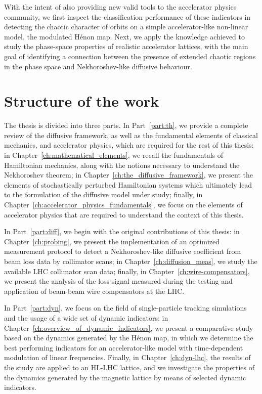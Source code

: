 With the intent of also providing new valid tools to the accelerator physics community, we first inspect the classification performance of these indicators in detecting the chaotic character of orbits on a simple accelerator-like non-linear model, the modulated Hénon map. Next, we apply the knowledge achieved to study the phase-space properties of realistic accelerator lattices, with the main goal of identifying a connection between the presence of extended chaotic regions in the phase space and Nekhoroshev-like diffusive behaviour.

\section*{Structure of the work}

The thesis is divided into three parts. In Part~\ref{part:th}, we provide a complete review of the diffusive framework, as well as the fundamental elements of classical mechanics, and accelerator physics, which are required for the rest of this thesis: in Chapter~\ref{ch:mathematical_elements}, we recall the fundamentals of Hamiltonian mechanics, along with the notions necessary to understand the Nekhoroshev theorem; in Chapter~\ref{ch:the_diffusive_framework}, we present the elements of stochastically perturbed Hamiltonian systems which ultimately lead to the formulation of the diffusive model under study; finally, in Chapter~\ref{ch:accelerator_physics_fundamentals}, we focus on the elements of accelerator physics that are required to understand the context of this thesis.

In Part~\ref{part:diff}, we begin with the original contributions of this thesis: in Chapter~\ref{ch:probing}, we present the implementation of an optimized measurement protocol to detect a Nekhoroshev-like diffusive coefficient from beam loss data by collimator scans; in Chapter~\ref{ch:diffusion_meas}, we study the available LHC collimator scan data; finally, in Chapter~\ref{ch:wire-compensators}, we present the analysis of the loss signal measured during the testing and application of beam-beam wire compensators at the LHC.

In Part~\ref{part:dyn}, we focus on the field of single-particle tracking simulations and the usage of a wide set of dynamic indicators: in Chapter~\ref{ch:overview_of_dynamic_indicators}, we present a comparative study based on the dynamics generated by the Hénon map, in which we determine the best performing indicators for an accelerator-like model with time-dependent modulation of linear frequencies. Finally, in Chapter~\ref{ch:dyn-lhc}, the results of the study are applied to an HL-LHC lattice, and we investigate the properties of the dynamics generated by the magnetic lattice by means of selected dynamic indicators.


